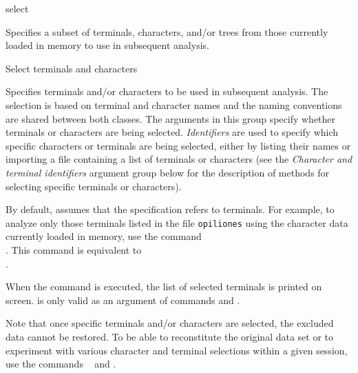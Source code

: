 \begin{command}{select}{}


	\begin{poydescription} 
            Specifies a subset of terminals, characters, and/or trees from those
            currently loaded in memory to use in subsequent analysis.
	\end{poydescription}
	

	\begin{arguments}
		
		\begin{argumentgroup}{Select terminals and characters}
            {Specifies terminals and/or characters to be used in subsequent
            analysis. The selection is based on terminal and character names
            and the naming conventions are shared between both classes.
            The arguments in this group specify whether terminals or characters
            are being selected.
            \emph{Identifiers} are used to specify which specific characters or
            terminals are being selected, either by listing their names or
            importing a file containing a list of terminals or characters (see
            the \emph{Character and terminal identifiers} argument group below
            for the description of methods for selecting specific terminals or characters).
            
            By default, \poy
            assumes that the specification refers to terminals. For example, to
            analyze only those terminals listed in the file \texttt{opiliones} using
            the character data currently loaded in memory, use the command \\
            . This  command is
            equivalent to \\ .
            
            When the command is executed, the list of selected terminals is
            printed on screen.   is only valid as an
            argument of commands  and .}
            
            \begin{statement}
  	Note that once specific terminals and/or  characters are selected, the excluded
	data cannot be restored. To be able to reconstitute the original data set or to
	experiment with various character and terminal selections within a given \poy
	session, use the commands ~ and .
	\end{statement}


\end{argumentgroup}
\end{arguments}
\end{command}
